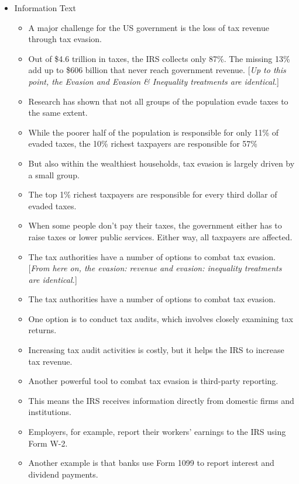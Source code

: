 \documentclass[11pt]{article}
\begin{document}
\begin{itemize}
\begin{itemize}
        \item Information Text
        \begin{itemize}
            \item A major challenge for the US government is the loss of tax revenue through tax evasion.
            \item Out of \$4.6 trillion in taxes, the IRS collects only 87\%. The missing 13\% add up to \$606 billion that never reach government revenue. [\textit{Up to this point, the Evasion and Evasion \& Inequality treatments are identical.}]
            \item Research has shown that not all groups of the population evade taxes to the same extent. 
            \item While the poorer half of the population is responsible for only 11\% of evaded taxes, the 10\% richest taxpayers are responsible for 57\% 
            \item But also within the wealthiest households, tax evasion is largely driven by a small group. 
            \item The top 1\% richest taxpayers are responsible for every third dollar of evaded taxes.  
            \item When some people don’t pay their taxes, the government either has to raise taxes or lower public services. Either way, all taxpayers are affected.
            \item The tax authorities have a number of options to combat tax evasion. [\textit{From here on, the evasion: revenue and evasion: inequality treatments are identical.}]
            \item The tax authorities have a number of options to combat tax evasion.
            \item One option is to conduct tax audits, which involves closely examining tax returns.
            \item Increasing tax audit activities is costly, but it helps the IRS to increase tax revenue.
            \item Another powerful tool to combat tax evasion is third-party reporting. 
            \item This means the IRS receives information directly from domestic firms and institutions.
            \item Employers, for example, report their workers’ earnings to the IRS using Form W-2.
            \item Another example is that banks use Form 1099 to report interest and dividend payments. 

\end{itemize}
\end{itemize}
\end{itemize}
\end{document}
